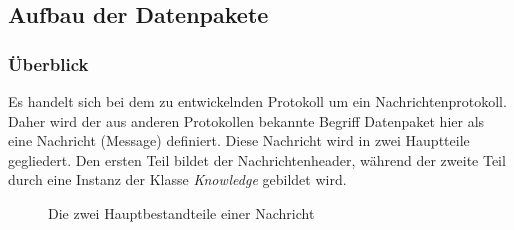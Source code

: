 \subsection{Aufbau der Datenpakete}
\subsubsection{Überblick}
Es handelt sich bei dem zu entwickelnden Protokoll um ein Nachrichtenprotokoll. Daher wird der aus anderen Protokollen bekannte Begriff Datenpaket hier als eine Nachricht (Message) definiert. Diese Nachricht wird in zwei Hauptteile gegliedert. Den ersten Teil bildet der Nachrichtenheader, während der zweite Teil durch eine Instanz der Klasse \textit{Knowledge} gebildet wird.
\begin{figure}[H]
	\centering
	\hspace*{1cm}
	\caption{Die zwei Hauptbestandteile einer Nachricht}
	\label{fig:message1}
\end{figure}
